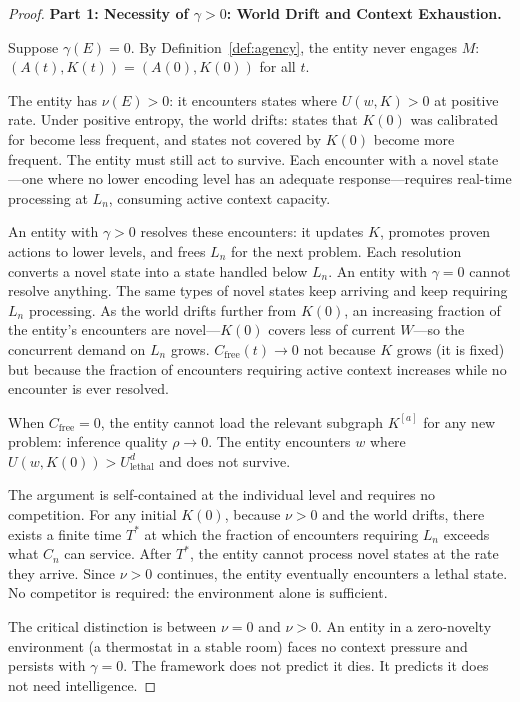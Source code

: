 \documentclass[11pt]{article}
\theoremstyle{definition}
\theoremstyle{remark}
\begin{document}
\begin{proof}

\textbf{Part 1: Necessity of $\gamma > 0$: World Drift and Context
Exhaustion.}

Suppose $\gamma(E) = 0$. By Definition~\ref{def:agency}, the entity never
engages $M$: $(A(t), K(t)) = (A(0), K(0))$ for all $t$.

The entity has $\nu(E) > 0$: it encounters states where $U(w, K) > 0$
at positive rate. Under positive entropy, the world drifts: states that
$K(0)$ was calibrated for become less frequent, and states not covered
by $K(0)$ become more frequent. The entity must still act to survive.
Each encounter with a novel state---one where no lower encoding level
has an adequate response---requires real-time processing at $L_n$,
consuming active context capacity.

An entity with $\gamma > 0$ resolves these encounters: it updates $K$,
promotes proven actions to lower levels, and frees $L_n$ for the next
problem. Each resolution converts a novel state into a state handled
below $L_n$. An entity with $\gamma = 0$ cannot resolve anything.
The same types of novel states keep arriving and keep requiring $L_n$
processing. As the world drifts further from $K(0)$, an increasing
fraction of the entity's encounters are novel---$K(0)$ covers less of
current $W$---so the concurrent demand on $L_n$ grows.
$C_{\mathrm{free}}(t) \to 0$ not because $K$ grows (it is fixed) but
because the fraction of encounters requiring active context increases
while no encounter is ever resolved.

When $C_{\mathrm{free}} = 0$, the entity cannot load the relevant
subgraph $K^{[a]}$ for any new problem: inference quality
$\rho \to 0$. The entity encounters $w$ where
$U(w, K(0)) > U_{\mathrm{lethal}}^d$ and does not survive.

The argument is self-contained at the individual level and requires no
competition. For any initial $K(0)$, because $\nu > 0$ and the world
drifts, there exists a finite time $T^*$ at which the fraction of
encounters requiring $L_n$ exceeds what $C_n$ can service. After $T^*$,
the entity cannot process novel states at the rate they arrive. Since
$\nu > 0$ continues, the entity eventually encounters a lethal state.
No competitor is required: the environment alone is sufficient.

The critical distinction is between $\nu = 0$ and $\nu > 0$. An entity
in a zero-novelty environment (a thermostat in a stable room) faces no
context pressure and persists with $\gamma = 0$. The framework does not
predict it dies. It predicts it does not need intelligence.


\end{proof}
\end{document}
